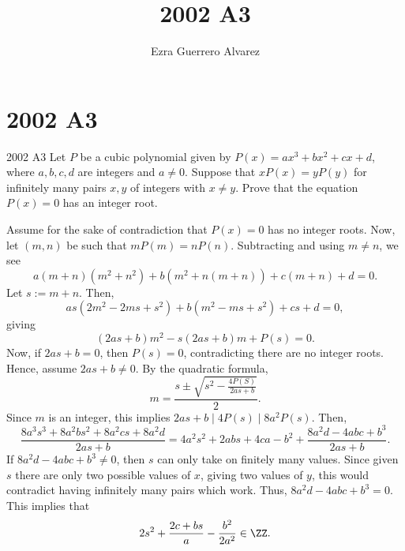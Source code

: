\documentclass[14pt]{article}
\title{2002 A3}
\author{Ezra Guerrero Alvarez}
\begin{document}
\maketitle
	
\section*{2002 A3}

\begin{statement}{2002 A3}
	Let $P$ be a cubic polynomial given by $P(x)=ax^3+bx^2+cx+d$, where $a,b,c,d$ are integers and $a\ne0$. Suppose that $xP(x)=yP(y)$ for infinitely many pairs $x,y$ of integers with $x\ne y$. Prove that the equation $P(x)=0$ has an integer root.
\end{statement}
Assume for the sake of contradiction that $P(x)=0$ has no integer roots. Now, let $(m,n)$ be such that $mP(m)=nP(n)$. Subtracting and using $m\ne n$, we see
\[ a(m+n)(m^2+n^2)+b(m^2+n(m+n))+c(m+n)+d=0. \]
Let $s:=m+n$. Then, 
\[ as(2m^2-2ms+s^2)+b(m^2-ms+s^2)+cs+d=0, \]
giving
\[ (2as+b)m^2-s(2as+b)m+P(s)=0. \]
Now, if $2as+b=0$, then $P(s)=0$, contradicting there are no integer roots. Hence, assume $2as+b\ne0$. By the quadratic formula,
\[ m=\frac{s\pm\sqrt{s^2-\frac{4P(S)}{2as+b}}}{2}. \]
Since $m$ is an integer, this implies $2as+b\mid 4P(s)\mid 8a^2P(s)$. Then,
\[ \frac{8a^3s^3+8a^2bs^2+8a^2cs+8a^2d}{2as+b}=4a^2s^2+2abs+4ca-b^2+\frac{8a^2d-4abc+b^3}{2as+b}. \]
If $8a^2d-4abc+b^3\ne0$, then $s$ can only take on finitely many values. Since given $s$ there are only two possible values of $x$, giving two values of $y$, this would contradict having infinitely many pairs which work. Thus, $8a^2d-4abc+b^3=0$. This implies that
\[ 2s^2+\frac{2c+bs}a-\frac{b^2}{2a^2}\in\ZZ. \]
	
\end{document}
